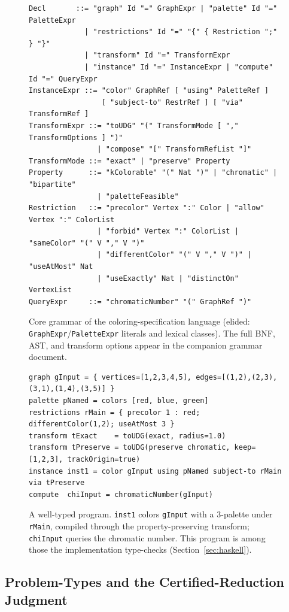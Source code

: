 \documentclass[11pt]{article}
\theoremstyle{definition}
\theoremstyle{remark}
\begin{document}
\begin{figure}[h]
\small
\begin{lstlisting}
Decl       ::= "graph" Id "=" GraphExpr | "palette" Id "=" PaletteExpr
             | "restrictions" Id "=" "{" { Restriction ";" } "}"
             | "transform" Id "=" TransformExpr
             | "instance" Id "=" InstanceExpr | "compute" Id "=" QueryExpr
InstanceExpr ::= "color" GraphRef [ "using" PaletteRef ]
                 [ "subject-to" RestrRef ] [ "via" TransformRef ]
TransformExpr ::= "toUDG" "(" TransformMode [ "," TransformOptions ] ")"
                | "compose" "[" TransformRefList "]"
TransformMode ::= "exact" | "preserve" Property
Property      ::= "kColorable" "(" Nat ")" | "chromatic" | "bipartite"
                | "paletteFeasible"
Restriction   ::= "precolor" Vertex ":" Color | "allow" Vertex ":" ColorList
                | "forbid" Vertex ":" ColorList | "sameColor" "(" V "," V ")"
                | "differentColor" "(" V "," V ")" | "useAtMost" Nat
                | "useExactly" Nat | "distinctOn" VertexList
QueryExpr     ::= "chromaticNumber" "(" GraphRef ")"
\end{lstlisting}
\caption{Core grammar of the coloring-specification language (elided:
\texttt{GraphExpr}/\texttt{PaletteExpr} literals and lexical classes). The full
BNF, AST, and transform options appear in the companion grammar document.}
\label{fig:grammar}
\end{figure}

\begin{figure}[h]
\small
\begin{lstlisting}
graph gInput = { vertices=[1,2,3,4,5], edges=[(1,2),(2,3),(3,1),(1,4),(3,5)] }
palette pNamed = colors [red, blue, green]
restrictions rMain = { precolor 1 : red; differentColor(1,2); useAtMost 3 }
transform tExact    = toUDG(exact, radius=1.0)
transform tPreserve = toUDG(preserve chromatic, keep=[1,2,3], trackOrigin=true)
instance inst1 = color gInput using pNamed subject-to rMain via tPreserve
compute  chiInput = chromaticNumber(gInput)
\end{lstlisting}
\caption{A well-typed program. \texttt{inst1} colors \texttt{gInput} with a
$3$-palette under \texttt{rMain}, compiled through the property-preserving
transform; \texttt{chiInput} queries the chromatic number. This program is among
those the implementation type-checks (Section~\ref{sec:haskell}).}
\label{fig:program}
\end{figure}

\subsection{Problem-Types and the Certified-Reduction Judgment}
\label{sec:sorts}
\end{document}

